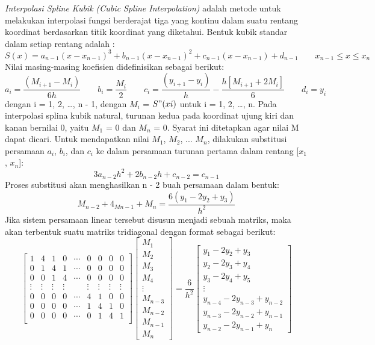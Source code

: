 \documentclass{article}
\begin{document}
{\it Interpolasi Spline Kubik (Cubic Spline Interpolation)} adalah metode untuk melakukan interpolasi fungsi berderajat tiga yang kontinu dalam suatu rentang koordinat berdasarkan titik koordinat yang diketahui. Bentuk kubik standar dalam setiap rentang adalah \cite{anton}:
\[
S{(x)} = a_{n-1}(x - x_{n-1})^3 + b_{n-1}(x - x_{n-1})^2 + c_{n-1}(x - x_{n-1}) + d_{n-1} \qquad x_{n-1} \leq x \leq x_n
\]
Nilai masing-masing koefisien didefinisikan sebagai berikut:
\[
a_i = \frac{(M_{i+1} - M_i)}{6h} \qquad
b_i = \frac{M_i}{2} \qquad
c_i = \frac{(y_{i+1} - y_i)}{h} - \frac{h[M_{i+1} + 2M_i]}{6} \qquad d_i = y_i
\]
dengan i = 1, 2, \ldots, n - 1, dengan $M_i$ = $S"(xi)$ untuk i = 1, 2, \ldots, n.
Pada interpolasi splina kubik natural, turunan kedua pada koordinat ujung kiri dan kanan bernilai 0, yaitu $M_1$ = 0 dan $M_n$ = 0. Syarat ini ditetapkan agar nilai M dapat dicari. Untuk mendapatkan nilai $M_1$, $M_2$, ... $M_n$, dilakukan substitusi persamaan $a_i$, $b_i$, dan $c_i$ ke dalam persamaan turunan pertama dalam rentang [$x_1$, $x_n$]:
\[
3a_{n-2}h^2 + 2b_{n-2}h + c_{n-2} = c_{n - 1}
\]
Proses substitusi akan menghasilkan n - 2 buah persamaan dalam bentuk:
\[
M_{n-2} + 4_{Mn-1} + M_n = \frac{6(y_1 - 2y_2 + y_3)}{h^2}
\]
Jika sistem persamaan linear tersebut disusun menjadi sebuah matriks, maka akan terbentuk suatu matriks tridiagonal dengan format sebagai berikut:
\[
\begin{bmatrix}
    1 & 4 & 1 & 0 & \cdots & 0 & 0 & 0 & 0 \\
    0 & 1 & 4 & 1 & \cdots & 0 & 0 & 0 & 0 \\
    0 & 0 & 1 & 4 & \cdots & 0 & 0 & 0 & 0 \\
    \vdots & \vdots & \vdots & \vdots  & &  \vdots & \vdots & \vdots & \vdots \\
    0 & 0 & 0 & 0 & \cdots & 4 & 1 & 0 & 0 \\
    0 & 0 & 0 & 0 & \cdots & 1 & 4 & 1 & 0 \\
    0 & 0 & 0 & 0 & \cdots & 0 & 1 & 4 & 1 \\
\end{bmatrix}
\begin{bmatrix}
    M_1 \\
    M_2 \\ 
    M_3 \\
    M_4 \\
    \vdots \\
    M_{n-3} \\
    M_{n-2} \\
    M_{n-1} \\
    M_{n} 
\end{bmatrix} = \frac{6}{h^2} 
\begin{bmatrix}
    y_1 - 2y_2 + y_3 \\
    y_2 - 2y_3 + y_4 \\
    y_3 - 2y_4 + y_5 \\
    \vdots \\
    y_{n-4} - 2y_{n-3} + y_{n-2} \\
    y_{n-3} - 2y_{n-2} + y_{n-1} \\
    y_{n-2} - 2y_{n-1} + y_{n}
\end{bmatrix}
\]
\end{document}
